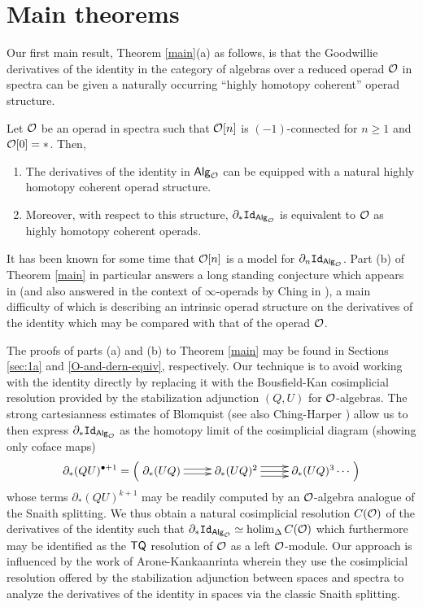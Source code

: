 \section{Main theorems}  Our first main result, Theorem \ref{main}(a) as follows, is that the Goodwillie derivatives of the identity in the category of algebras over a reduced operad $\mathcal{O}$ in spectra can be given a naturally occurring ``highly homotopy coherent'' operad structure. 

\begin{theorem} \label{main} Let $\mathcal{O}$ be an operad in spectra such that $\mathcal{O}[n]$ is $(-1)$-connected for $n\geq 1$ and $\mathcal{O}[0]=*$. Then,
    \begin{enumerate}[label=(\alph*)]
        \item The derivatives of the identity in ${\mathsf{Alg}_{\mathcal{O}}}$ can be equipped with a natural highly homotopy coherent operad structure.
        \item Moreover, with respect to this structure, $\partial_* \mathtt{Id}_{{\mathsf{Alg}_{\mathcal{O}}}}$ is equivalent to $\mathcal{O}$ as highly homotopy coherent operads. 
    \end{enumerate}
\end{theorem}

It has been known for some time that $\mathcal{O}[n]$ is a model for $\partial_n \mathtt{Id}_{{\mathsf{Alg}_{\mathcal{O}}}}$. Part (b) of Theorem \ref{main} in particular answers a long standing conjecture which appears in \cite{AC-1} (and also answered in the context of $\infty$-operads by Ching in \cite{Ching-day-conv}), a main difficulty of which is describing an intrinsic operad structure on the derivatives of the identity which may be compared with that of the operad $\mathcal{O}$.  

The proofs of parts (a) and (b) to Theorem \ref{main} may be found in Sections \ref{sec:1a} and \ref{O-and-dern-equiv}, respectively. Our technique is to avoid working with the identity directly by replacing it with the Bousfield-Kan cosimplicial resolution provided by the stabilization adjunction $(Q,U)$ for $\mathcal{O}$-algebras. The strong cartesianness estimates of Blomquist \cite{Blom} (see also Ching-Harper \cite{Ching-Harper-BM}) allow us to then express $\partial_* \mathtt{Id}_{{\mathsf{Alg}_{\mathcal{O}}}}$ as the homotopy limit of the cosimplicial diagram (showing only coface maps) \begin{equation} \label{eq:der-model-stab} \partial_*(QU)^{\bullet+1}=  \left(\xymatrix{
    \partial_*(UQ) \ar@<-.5ex>[r] \ar@<.5ex>[r] &
    \partial_*(UQ)^2 \ar@<-1ex>[r] \ar[r] \ar@<1ex>[r] &
    \partial_*(UQ)^3  \cdots 
}\right)\end{equation}
whose terms $\partial_*(QU)^{k+1}$ may be readily computed by an $\mathcal{O}$-algebra analogue of the Snaith splitting. We thus obtain a natural cosimplicial resolution $C(\mathcal{O})$ of the derivatives of the identity such that $\partial_* \mathtt{Id}_{{\mathsf{Alg}_{\mathcal{O}}}}\simeq \operatorname{holim}_{\Delta} C(\mathcal{O})$ which furthermore may be identified as the $\mathsf{TQ}$ resolution of $\mathcal{O}$ as a left $\mathcal{O}$-module. Our approach is influenced by the work of Arone-Kankaanrinta \cite{AK} wherein they use the cosimplicial resolution offered by the stabilization adjunction between spaces and spectra to analyze the derivatives of the identity in spaces via the classic Snaith splitting. 

